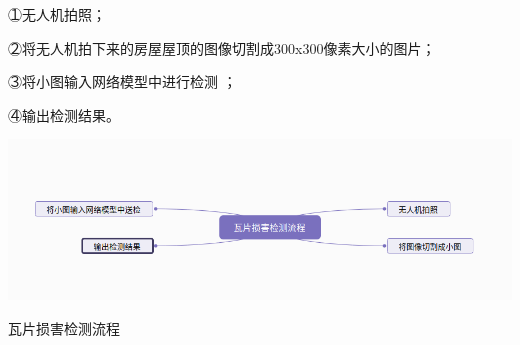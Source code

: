 \textcircled{１}无人机拍照；

\textcircled{２}将无人机拍下来的房屋屋顶的图像切割成300x300像素大小的图片；

\textcircled{３}将小图输入网络模型中进行检测 ；

\textcircled{４}输出检测结果。
\begin{uscfigure}
	\includegraphics[width=\textwidth]{./Pictures/liucheng.png}	
	\caption{瓦片损害检测流程}
	\label{rcnn}
\end{uscfigure}